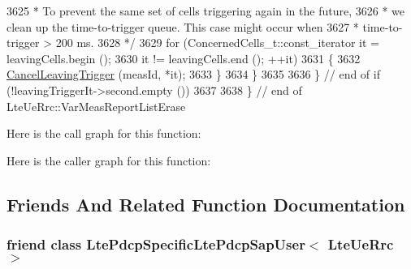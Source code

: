 \begin{DoxyCode}
3625 \textcolor{comment}{           * To prevent the same set of cells triggering again in the future,}
3626 \textcolor{comment}{           * we clean up the time-to-trigger queue. This case might occur when}
3627 \textcolor{comment}{           * time-to-trigger > 200 ms.}
3628 \textcolor{comment}{           */}
3629           \textcolor{keywordflow}{for} (ConcernedCells\_t::const\_iterator it = leavingCells.begin ();
3630                it != leavingCells.end (); ++it)
3631             \{
3632               \hyperlink{classns3_1_1LteUeRrc_a3e35c475cfb5361222f1556bfbd3111d}{CancelLeavingTrigger} (measId, *it);
3633             \}
3634         \}
3635 
3636     \} \textcolor{comment}{// end of if (!leavingTriggerIt->second.empty ())}
3637 
3638 \} \textcolor{comment}{// end of LteUeRrc::VarMeasReportListErase}
\end{DoxyCode}


Here is the call graph for this function\+:




Here is the caller graph for this function\+:




\subsection{Friends And Related Function Documentation}
\subsubsection[{\texorpdfstring{Lte\+Pdcp\+Specific\+Lte\+Pdcp\+Sap\+User$<$ Lte\+Ue\+Rrc $>$}{LtePdcpSpecificLtePdcpSapUser< LteUeRrc >}}]{\setlength{\rightskip}{0pt plus 5cm}friend class {\bf Lte\+Pdcp\+Specific\+Lte\+Pdcp\+Sap\+User}$<$ {\bf Lte\+Ue\+Rrc} $>$\hspace{0.3cm}{\ttfamily [friend]}}\hypertarget{classns3_1_1LteUeRrc_ad5c840da37dc8cbaa258c2a2ea9544e6}{}\label{classns3_1_1LteUeRrc_ad5c840da37dc8cbaa258c2a2ea9544e6}

